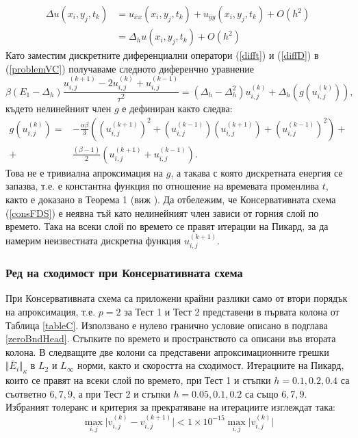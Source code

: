 \documentclass[a4paper]{article}
\newcommand{\be}{\begin{equation}}
\newcommand{\ee}{\end{equation}}
\newcommand{\rf}[1]{(\ref{#1})}
\theoremstyle{remark}
\begin{document}
\begin{align}\label{diffD}
\Delta u(x_i, y_j, t_k )  &= u_{\bar{x}x}(x_i, y_j, t_k ) +  u_{\bar{y}y}(x_i, y_j, t_k ) +  O(h^2)  \nonumber\\
			      &= \Delta_h u(x_i, y_j, t_k ) +  O(h^2) 
\end{align}
Като заместим дискретните диференциални оператори \rf{difft} и \rf{diffD} в \rf{problemVC} получаваме следното диференчно уравнение
\be\label{consFDS}
\beta (E_1-\Delta_h)\frac{ u^{(k+1)}_{i, j} - 2u^{(k)}_{i,j} + u^{(k-1)}_{i,j} }{\tau^2} = (\Delta_h - \Delta_h^2)u^{(k)}_{i,j} + \Delta_h(g(u^{(k)}_{i,j})),
\ee
%
където нелинейният член $g$ е дефиниран както следва:
\begin{align}
g(u^{(k)}_{i,j})=& -\frac{\alpha \beta} { 3 } \left( (u^{(k+1)}_{i,j})^2 + (u^{(k-1)}_{i,j})(u^{(k+1)}_{i,j}) + (u^{(k-1)}_{i,j})^2 \right) + \nonumber\\
+&\frac{ (\beta - 1 )}{ 2 }\left( u^{(k+1)}_{i,j} + u^{(k-1)}_{i,j} \right).
\end{align}
Това не е тривиална апроксимация на $g$, а такава с която дискретната енергия се запазва, т.е. е константна функция по отношение на времевата променлива $t$, както е доказано в Теорема 1 (виж \cite{ref20}). Да отбележим, че Консервативната схема \rf{consFDS} е неявна тъй като нелинейният член зависи от горния слой по времето. Така на всеки слой по времето се правят итерации на Пикард, за да намерим неизвестната дискретна функция $u^{(k+1)}_{i,j}$.

\subsubsection{Ред на сходимост при Консервативната схема}\label{convRateCons}
При Консервативната схема са приложени крайни разлики само от втори порядък на апроксимация, т.е. $p=2$ за Тест 1 и Тест 2 представени в първата колона от Таблица \ref{tableC}. Използвано е нулево гранично условие описано в подглава \ref{zeroBndHead}. Стъпките по времето и пространството са описани във втората колона. В следващите две колони са представени апроксимационните грешки  $\Vert \bar E_i \Vert_\kappa$ в $L_2$ и $L_{\infty}$ норми, както и скоростта на сходимост. Итерациите на Пикард, които се правят на всеки слой по времето, при Тест 1 и стъпки $h=0.1, 0.2, 0.4$ са съответно $6, 7, 9$, а при Тест 2 и стъпки $h=0.05, 0.1, 0.2$ са също $6, 7, 9$. Избраният толеранс и критерия за прекратяване на итерациите изглеждат така:
\be\label{picardCrit}
\max_{i,j} \vert v_{i,j}^{(k)} - v_{i,j}^{(k+1)} \vert < 1 \times 10^{-15} \max_{i,j} \vert v_{i,j}^{(k)} \vert
\ee
\end{document}
